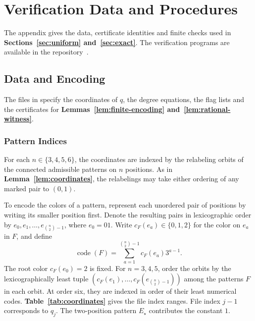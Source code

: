 \documentclass[preprint,11pt,numbers]{elsarticle-arxiv}
\numberwithin{equation}{section}
\theoremstyle{definition}
\begin{document}
\section*{Verification Data and Procedures}
The appendix gives the data, certificate identities and finite checks used
in \textbf{Sections~\ref{sec:uniform} and~\ref{sec:exact}}. The verification
programs are available in the repository~\cite{FGSTCode}.
\setcounter{subsection}{0}
\setcounter{secnumdepth}{4}
\renewcommand{\thesubsection}{S\Alph{subsection}}
\renewcommand{\theHsubsection}{appendix.\arabic{subsection}}
\renewcommand{\theequation}{\thesubsection.\arabic{equation}}
\renewcommand{\thetheorem}{\thesubsection.\arabic{theorem}}
\renewcommand{\thefigure}{\thesubsection.\arabic{figure}}
\renewcommand{\thetable}{\thesubsection.\arabic{table}}
\renewcommand{\theHfigure}{supp.\thesubsection.\arabic{figure}}
\renewcommand{\theHtable}{supp.\thesubsection.\arabic{table}}
\renewcommand{\theHequation}{supp.\thesubsection.\arabic{equation}}
\renewcommand{\theHtheorem}{supp.\thesubsection.\arabic{theorem}}
\subsection{Data and Encoding}\label{app:data-specification}

The files in  specify the coordinates of
$q$, the degree equations, the flag lists and the certificates for
\textbf{Lemmas~\ref{lem:finite-encoding} and~\ref{lem:rational-witness}}.

\subsubsection{Pattern Indices}\label{app:pattern-indices}

For each $n\in\{3,4,5,6\}$, the coordinates are indexed by the
relabeling orbits of the connected admissible patterns on $n$ positions.
As in \textbf{Lemma~\ref{lem:coordinates}}, the relabelings may take
either ordering of any marked pair to $(0,1)$.

To encode the colors of a pattern, represent each unordered pair of
positions by writing its smaller position first. Denote the resulting
pairs in lexicographic order by $e_0,e_1,\ldots,e_{\binom{n}{2}-1}$,
where $e_0=01$. Write $c_F(e_a)\in\{0,1,2\}$ for the color on
$e_a$ in $F$, and define
\begin{equation}\label{eq:pattern-code}
 \operatorname{code}(F)=\sum_{a=1}^{\binom{n}{2}-1}c_F(e_a)3^{a-1}.
\end{equation}
The root color $c_F(e_0)=2$ is fixed. For $n=3,4,5$, order the orbits by the lexicographically least tuple
$(c_F(e_1),\ldots,c_F(e_{\binom n2-1}))$ among the patterns $F$ in
each orbit. At order six, they are indexed in order of their least numerical
codes. \textbf{Table~\ref{tab:coordinates}} gives the file index ranges.
File index $j-1$ corresponds to $q_j$. The two-position pattern
$E_\star$ contributes the constant $1$.
\end{document}
